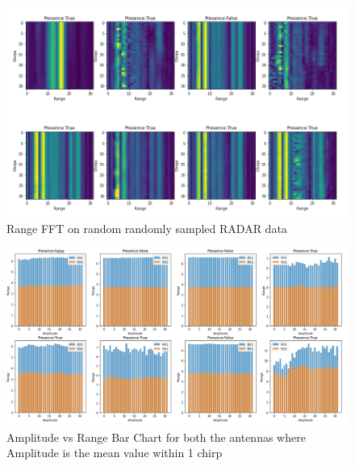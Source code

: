 \begin{figure}[ht]
  \begin{center}
    \includegraphics[width=01\textwidth]{Master's thesis/images/fft_1_antenna.PNG} 
    \caption{Range FFT on random randomly sampled RADAR data}
    \label{fig:FFT_plot}
  \end{center}
\end{figure}  
\begin{figure}[ht]
  \begin{center}
    \includegraphics[width=01\textwidth]{Master's thesis/images/ff_bar.png} 
    \caption{Amplitude vs Range Bar Chart for both the antennas where Amplitude is the mean value within 1 chirp}
    \label{fig:FFT_bar}
  \end{center}
\end{figure}
